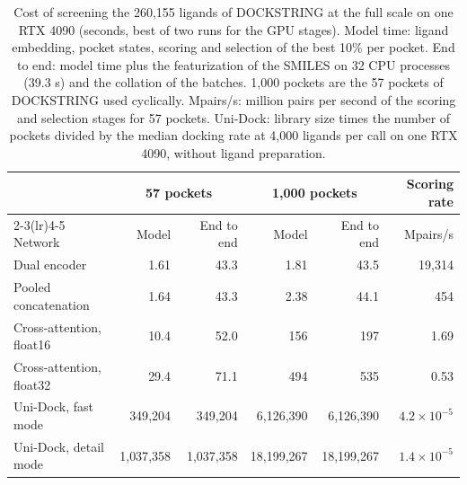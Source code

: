 \begin{table}[h]
\caption{Cost of screening the 260{,}155 ligands of DOCKSTRING at the full scale on one RTX 4090 (seconds, best of two runs for the GPU stages). Model time: ligand embedding, pocket states, scoring and selection of the best 10\% per pocket. End to end: model time plus the featurization of the SMILES on 32 CPU processes (39.3 s) and the collation of the batches. 1{,}000 pockets are the 57 pockets of DOCKSTRING used cyclically. Mpairs/s: million pairs per second of the scoring and selection stages for 57 pockets. Uni-Dock: library size times the number of pockets divided by the median docking rate at 4{,}000 ligands per call on one RTX 4090, without ligand preparation.}
\label{tab:si_cost_full}
\centering
\footnotesize
\setlength{\tabcolsep}{3pt}
\begin{tabular}{lrrrrr}
\toprule
 & \multicolumn{2}{c}{57 pockets} & \multicolumn{2}{c}{1{,}000 pockets} & Scoring rate \\
\cmidrule(lr){2-3}\cmidrule(lr){4-5}
Network & Model & End to end & Model & End to end & Mpairs/s \\
\midrule
Dual encoder & 1.61 & 43.3 & 1.81 & 43.5 & 19{,}314 \\
Pooled concatenation & 1.64 & 43.3 & 2.38 & 44.1 & 454 \\
Cross-attention, float16 & 10.4 & 52.0 & 156 & 197 & 1.69 \\
Cross-attention, float32 & 29.4 & 71.1 & 494 & 535 & 0.53 \\
Uni-Dock, fast mode & 349{,}204 & 349{,}204 & 6{,}126{,}390 & 6{,}126{,}390 & $4.2\times10^{-5}$ \\
Uni-Dock, detail mode & 1{,}037{,}358 & 1{,}037{,}358 & 18{,}199{,}267 & 18{,}199{,}267 & $1.4\times10^{-5}$ \\
\bottomrule
\end{tabular}
\end{table}
